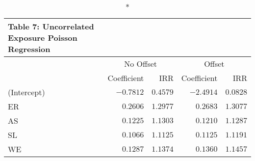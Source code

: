 \begin{longtable}{l|rrrr}
\caption*{
{\large Table 7: Uncorrelated Exposure Poisson Regression}
} \\ 
\toprule
\multicolumn{1}{l}{} & \multicolumn{2}{c}{No Offset} & \multicolumn{2}{c}{Offset} \\ 
\cmidrule(lr){2-3} \cmidrule(lr){4-5}
\multicolumn{1}{l}{} & Coefficient & IRR & Coefficient & IRR \\ 
\midrule
(Intercept) & $-0.7812$ & $0.4579$ & $-2.4914$ & $0.0828$ \\ 
ER & $0.2606$ & $1.2977$ & $0.2683$ & $1.3077$ \\ 
AS & $0.1225$ & $1.1303$ & $0.1210$ & $1.1287$ \\ 
SL & $0.1066$ & $1.1125$ & $0.1125$ & $1.1191$ \\ 
WE & $0.1287$ & $1.1374$ & $0.1360$ & $1.1457$ \\ 
\bottomrule
\end{longtable}

